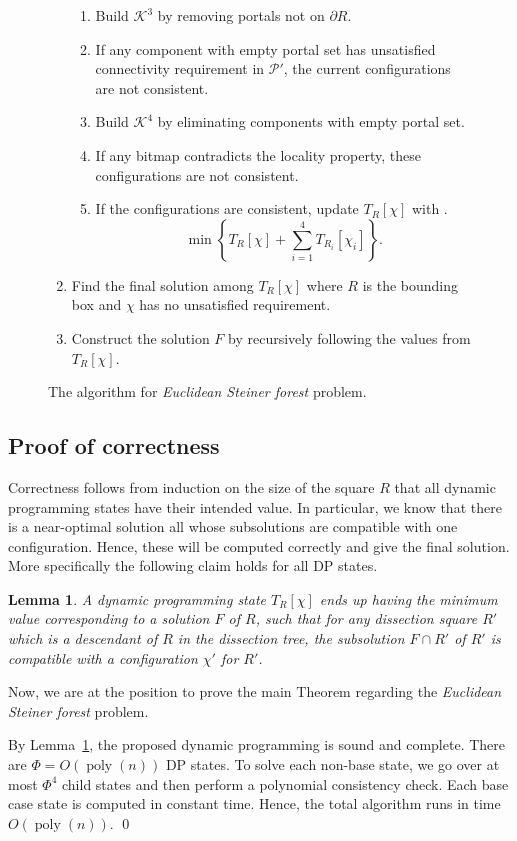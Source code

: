 \documentclass[extras,11pt]{article} \usepackage{fullpage}
\theoremstyle{mytheorem}
\newtheorem{lemma}[theorem]{Lemma}
\newenvironment{proofof}[1]{\par\noindent{\bf #1.}\hspace{0.5em}}
    {\hfill\qed\vspace{1ex}}
\DeclareMathOperator{\poly}{poly}
\newcommand{\prob}[1]{\textit{#1}}
\begin{document}
\begin{figure}
\begin{algorithm}
\begin{enumerate}
\begin{enumerate}
 \item Build $\mathcal{K}^3$ by removing portals not on $\partial R$.
 \item If any component with empty portal set has unsatisfied connectivity requirement in $\mathcal{P}'$, the current configurations are not consistent.
 \item Build $\mathcal{K}^4$ by eliminating components with empty portal set.
 \item If any bitmap contradicts the locality property, these configurations are not consistent.
 \item If the configurations are consistent, update $T_R[\chi]$ with .
\[ \min \left\{ T_R[\chi] + \sum_{i=1}^4 T_{R_i}[\chi_i]\right\}.\]
\end{enumerate}
\item Find the final solution among $T_R[\chi]$ where $R$ is the bounding box and $\chi$ has no unsatisfied requirement.
\item Construct the solution $F$ by recursively following the values from $T_R[\chi]$.
\end{enumerate}
\end{algorithm}
\caption{The algorithm for \prob{Euclidean Steiner forest} problem.\label{fig:for-alg}}
\end{figure}



\subsection{Proof of correctness}
Correctness follows from induction on the size of the square $R$ that all dynamic programming states have their intended value.
In particular, we know that there is a near-optimal solution all whose subsolutions are compatible with one configuration.
Hence, these will be computed correctly and give the final solution.
More specifically the following claim holds for all DP states.
\begin{lemma}\label{lem:dp-sf}
A dynamic programming state $T_{R}[\chi]$ ends up having the minimum value corresponding to a solution $F$ of $R$, such that for any dissection square $R'$ which is a descendant of $R$ in the dissection tree, the subsolution $F\cap R'$ of $R'$ is compatible with a configuration $\chi'$ for $R'$.
\end{lemma}



Now, we are at the position to prove the main Theorem regarding the \prob{Euclidean Steiner forest} problem.
\begin{proofof}{\proofname\ of Theorem~\ref{thm:sf}}
By Lemma~\ref{lem:dp-sf}, the proposed dynamic programming is sound and complete.
There are $\Phi=O(\poly(n))$ DP states.
To solve each non-base state, we go over at most $\Phi^4$ child states and then perform a polynomial consistency check.
Each base case state is computed in constant time.
Hence, the total algorithm runs in time $O(\poly(n))$.
\end{proofof}
\end{document}
